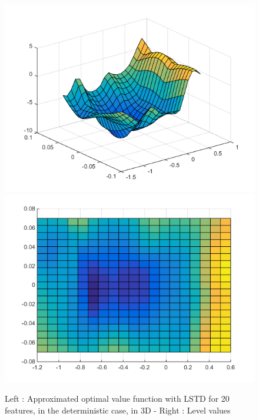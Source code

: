 \documentclass[a4paper, 12pt]{article}
\begin{document}
\begin{figure}[H]
	\centering
	\noindent\includegraphics[scale=0.3]{lstd-30feat-determ.png}
	\noindent\includegraphics[scale=0.3]{lstd-30feat-determ-flat.png}
	\caption{Left : Approximated optimal value function with LSTD for 20 features, in the deterministic case, in 3D - Right : Level values}
\end{figure}
\end{document}
